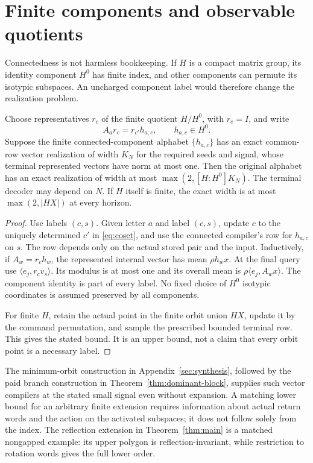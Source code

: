 \section{Finite components and observable quotients}\label{sec:components}
Connectedness is not harmless bookkeeping. If $H$ is a compact matrix group, its identity component $H^0$ has finite index, and other components can permute its isotypic subspaces. An uncharged component label would therefore change the realization problem.

\begin{proposition}\label{prop:components}
Choose representatives $r_c$ of the finite quotient $H/H^0$, with $r_e=I$, and write
\begin{equation}\label{eq:coset}
 A_ar_c=r_{c'}h_{a,c},\qquad h_{a,c}\in H^0.
\end{equation}
Suppose the finite connected-component alphabet $\{h_{a,c}\}$ has an exact common-row vector realization of width $K_N$ for the required seeds and signal, whose terminal represented vectors have norm at most one. Then the original alphabet has an exact realization of width at most $\max(2,[H:H^0]K_N)$. The terminal decoder may depend on $N$.
If $H$ itself is finite, the exact width is at most $\max(2,|HX|)$ at every horizon.
\end{proposition}
\begin{proof}
Use labels $(c,s)$. Given letter $a$ and label $(c,s)$, update $c$ to the uniquely determined $c'$ in \eqref{eq:coset}, and use the connected compiler's row for $h_{a,c}$ on $s$. The row depends only on the actual stored pair and the input. Inductively, if $A_w=r_c h_w$, the represented internal vector has mean $\rho h_wx$. At the final query use $\langle e_j,r_cv_s\rangle$. Its modulus is at most one and its overall mean is $\rho\langle e_j,A_wx\rangle$. The component identity is part of every label. No fixed choice of $H^0$ isotypic coordinates is assumed preserved by all components.

For finite $H$, retain the actual point in the finite orbit union $HX$, update it by the command permutation, and sample the prescribed bounded terminal row. This gives the stated bound. It is an upper bound, not a claim that every orbit point is a necessary label.
\end{proof}

The minimum-orbit construction in Appendix~\ref{sec:synthesis}, followed by the paid branch construction in Theorem~\ref{thm:dominant-block}, supplies such vector compilers at the stated small signal even without expansion. A matching lower bound for an arbitrary finite extension requires information about actual return words and the action on the activated subspaces; it does not follow solely from the index. The reflection extension in Theorem~\ref{thm:main} is a matched nongapped example: its upper polygon is reflection-invariant, while restriction to rotation words gives the full lower order.

